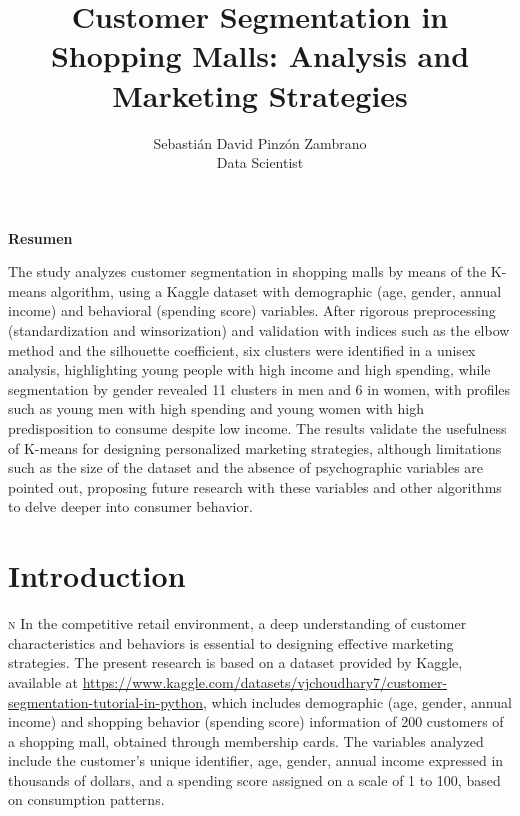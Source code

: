 \documentclass[10pt]{article}
\title{Customer Segmentation in Shopping Malls: Analysis and Marketing Strategies}
\author{Sebastián David Pinzón Zambrano \\ {\small Data Scientist}}
\date{}
\newcommand*\initfamily{\usefont{U}{GoudyIn}{xl}{n}}
\begin{document}
\maketitle

\begin{center}
    {\footnotesize \textbf{Resumen}}  
\end{center}

\begin{center}
    \begin{minipage}{0.85\textwidth} %
        {\footnotesize
        The study analyzes customer segmentation in shopping malls by means of the K-means algorithm, using a Kaggle dataset with demographic (age, gender, annual income) and behavioral (spending score) variables. After rigorous preprocessing (standardization and winsorization) and validation with indices such as the elbow method and the silhouette coefficient, six clusters were identified in a unisex analysis, highlighting young people with high income and high spending, while segmentation by gender revealed 11 clusters in men and 6 in women, with profiles such as young men with high spending and young women with high predisposition to consume despite low income. The results validate the usefulness of K-means for designing personalized marketing strategies, although limitations such as the size of the dataset and the absence of psychographic variables are pointed out, proposing future research with these variables and other algorithms to delve deeper into consumer behavior.
        }
    \end{minipage}
\end{center}

\vspace{10pt}
\section{Introduction}
\vspace{5pt}
\sloppy %

\lettrine[lines=3, loversize=0.01, lhang=0.01]{\scalebox{0.9}{\initfamily I}}{n} In the competitive retail environment, a deep understanding of customer characteristics and behaviors is essential to designing effective marketing strategies. The present research is based on a dataset provided by Kaggle, available at  \url{https://www.kaggle.com/datasets/vjchoudhary7/customer-segmentation-tutorial-in-python}, which includes demographic (age, gender, annual income) and shopping behavior (spending score) information of 200 customers of a shopping mall, obtained through membership cards. The variables analyzed include the customer's unique identifier, age, gender, annual income expressed in thousands of dollars, and a spending score assigned on a scale of 1 to 100, based on consumption patterns.
\end{document}

